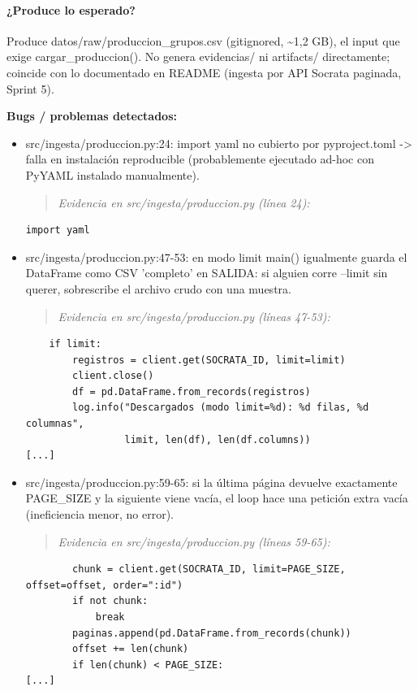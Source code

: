\paragraph{¿Produce lo esperado?}
Produce datos/raw/produccion\_grupos.csv (gitignored, \textasciitilde{}1,2 GB), el input que exige cargar\_produccion(). No genera evidencias/ ni artifacts/ directamente; coincide con lo documentado en README (ingesta por API Socrata paginada, Sprint 5).

\begin{tcolorbox}[riesgo]
\textbf{Bugs / problemas detectados:}
\begin{itemize}
  \item src/ingesta/produccion.py:24: import yaml no cubierto por pyproject.toml -> falla en instalación reproducible (probablemente ejecutado ad-hoc con PyYAML instalado manualmente).
\begin{quote}\footnotesize\ttfamily
\noindent\emph{Evidencia en src/ingesta/produccion.py (línea 24):}
\end{quote}
\begin{lstlisting}
import yaml
\end{lstlisting}

  \item src/ingesta/produccion.py:47-53: en modo limit main() igualmente guarda el DataFrame como CSV 'completo' en SALIDA: si alguien corre --limit sin querer, sobrescribe el archivo crudo con una muestra.
\begin{quote}\footnotesize\ttfamily
\noindent\emph{Evidencia en src/ingesta/produccion.py (líneas 47-53):}
\end{quote}
\begin{lstlisting}
    if limit:
        registros = client.get(SOCRATA_ID, limit=limit)
        client.close()
        df = pd.DataFrame.from_records(registros)
        log.info("Descargados (modo limit=%d): %d filas, %d columnas",
                 limit, len(df), len(df.columns))
[...]
\end{lstlisting}

  \item src/ingesta/produccion.py:59-65: si la última página devuelve exactamente PAGE\_SIZE y la siguiente viene vacía, el loop hace una petición extra vacía (ineficiencia menor, no error).
\begin{quote}\footnotesize\ttfamily
\noindent\emph{Evidencia en src/ingesta/produccion.py (líneas 59-65):}
\end{quote}
\begin{lstlisting}
        chunk = client.get(SOCRATA_ID, limit=PAGE_SIZE, offset=offset, order=":id")
        if not chunk:
            break
        paginas.append(pd.DataFrame.from_records(chunk))
        offset += len(chunk)
        if len(chunk) < PAGE_SIZE:
[...]
\end{lstlisting}

\end{itemize}
\end{tcolorbox}


